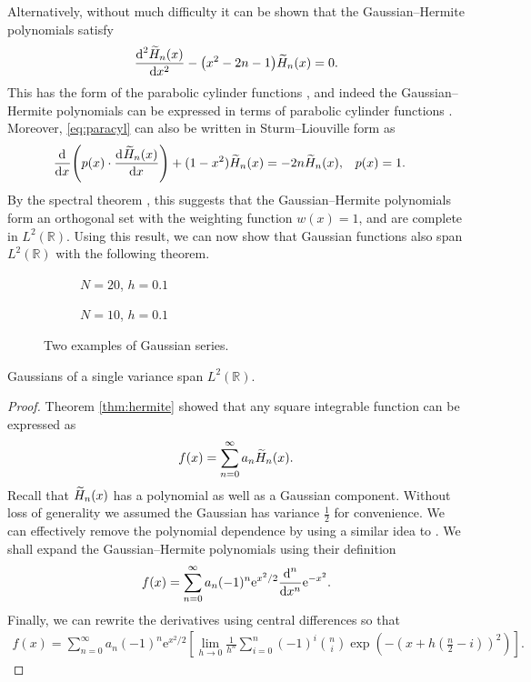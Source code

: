 Alternatively, without much difficulty it can be shown that the Gaussian--Hermite polynomials satisfy
\begin{align}
\label{eq:paracyl}
\diff[2]{\Her{n}{x}}{x} - \left( x^2 - 2n - 1 \right) \Her{n}{x} = 0.
\end{align}
This has the form of the parabolic cylinder functions \cite{miller}, and indeed the Gaussian--Hermite polynomials can be expressed in terms of parabolic cylinder functions \cite{hochstrasser, miller}. Moreover, \eqref{eq:paracyl} can also be written in Sturm--Liouville form as
\begin{align*}
\diff{}{x} \left( p(x) \cdot \diff{\Her{n}{x}}{x} \right) + (1 - x^2) \Her{n}{x} &= -2n \Her{n}{x}, & p(x) &= 1.
\end{align*}
By the spectral theorem \cite{griffel, higson, kreyszig}, this suggests that the Gaussian--Hermite polynomials form an orthogonal set with the weighting function $w(x) = 1$, and are complete in $L^2(\mathbb{R})$. Using this result, we can now show that Gaussian functions also span $L^2(\mathbb{R})$ with the following theorem. \\

\begin{figure}[tbp]
\begin{subfigure}{0.5\textwidth}

\caption{$N = 20$, $h = 0.1$}
\end{subfigure}
\begin{subfigure}{0.5\textwidth}

\caption{$N = 10$, $h = 0.1$}
\end{subfigure}
\caption{Two examples of Gaussian series.}
\label{fig:gs}
\end{figure}

\begin{theorem}
\label{thm:gaussian}
Gaussians of a single variance span $L^2(\mathbb{R})$.
\end{theorem}
\begin{proof}
Theorem \ref{thm:hermite} showed that any square integrable function can be expressed as
\begin{align*}
f(x) = \sum_{n = 0}^\infty a_n \Her{n}{x}.
\end{align*}
Recall that $\Her{n}{x}$ has a polynomial as well as a Gaussian component. Without loss of generality we assumed the Gaussian has variance $\frac{1}{2}$ for convenience. We can effectively remove the polynomial dependence by using a similar idea to \cite{calcaterra2, calcaterra}. We shall expand the Gaussian--Hermite polynomials using their definition
\begin{align*}
f(x) = \sum_{n = 0}^\infty a_n (-1)^n \textrm{e}^{x^2/2} \diff[n]{}{x} \textrm{e}^{-x^2}.
\end{align*}
Finally, we can rewrite the derivatives using central differences \cite{zwillinger} so that
\begin{align}
f(x) = \sum_{n = 0}^\infty a_n (-1)^n \textrm{e}^{x^2/2} \left[ \lim_{h \rightarrow 0} \frac{1}{h^n} \sum_{i = 0}^n (-1)^i \binom{n}{i} \exp\left( -\left( x + h\left( \frac{n}{2} - i \right) \right)^2 \right) \right].
\label{eq:gs}
\end{align}
\end{proof}

